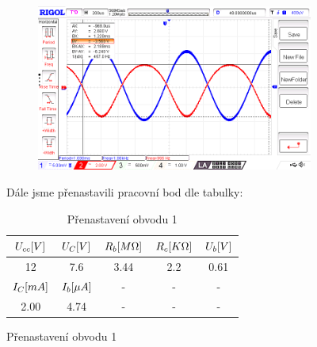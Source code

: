 \documentclass{article}
\begin{document}
\begin{figure}[H]
	\begin{minipage}[t]{0.6\textwidth}
    \vspace{-10mm}
    \begin{figure}[H]
      \includegraphics[width=\textwidth]{LAB/NewFile4.png}
      \caption{\label{obvod_z_laborky}}
    \end{figure}
  \end{minipage}
  \hfill
	\begin{minipage}[t]{0.35\textwidth}
    Dále jsme přenastavili pracovní bod dle tabulky:
    \begin{table}[H]
      \hspace{-5mm}
      \small
      \begin{tabular}{|c|c|c|c|c|} 
        \hline
        \(U_{cc}\-[V]\) & \(U_{C}\-[V]\)  & \(R_b\-[M\Omega]\) & \(R_c\-[K\Omega]\) & \(U_{b}\-[V]\)  \\ \hline
        12              & 7.6             & 3.44               & 2.2                & 0.61            \\ \hline
        \hline
        \(I_{C}\-[mA]\) & \(I_{b}\-[\mu A]\) & - & - & - \\\hline
        2.00            & 4.74               & - & - & - \\\hline
      \end{tabular}
      \normalsize
      \caption{\label{tab_pracovni_bod_rozladeni1} Přenastavení obvodu 1}
    \end{table}
  \end{minipage}
\end{figure}
\end{document}
